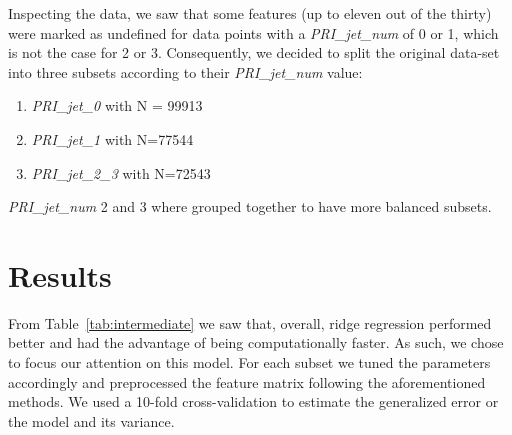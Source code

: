 \documentclass[10pt,conference,compsocconf]{IEEEtran}
\begin{document}
Inspecting the data, we saw that some features (up to eleven out of the thirty) 
were marked as undefined for data points with a \textit{PRI\_jet\_num} of 0 or 1, 
which is not the case for 2 or 3. Consequently, we decided to split the 
original data-set into three subsets according to their \textit{PRI\_jet\_num} value: 
\begin{enumerate}
    \item \textit{PRI\_jet\_0} with N = 99913
    \item \textit{PRI\_jet\_1} with N=77544
    \item \textit{PRI\_jet\_2\_3} with N=72543
\end{enumerate}
\textit{PRI\_jet\_num} 2 and 3 where grouped together to have more 
balanced subsets.

\section{Results}
From Table~\ref{tab:intermediate} we saw that, overall, ridge regression
performed better and had the advantage of being computationally faster.
As such, we chose to focus our attention on this model. For each subset we
tuned the parameters accordingly and preprocessed the feature matrix 
following the aforementioned methods. 
We used a 10-fold cross-validation to estimate the generalized error or the 
model and its variance.

\begin{table}[ht]
\centering
{}
\caption{Parameters, F1-score and accuracy results.}
\label{tab:3_models}
\end{table}
\end{document}
